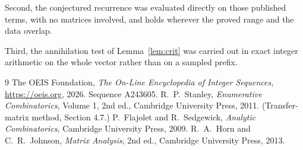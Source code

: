 \documentclass[11pt,a4paper]{article}
\theoremstyle{plain}
\theoremstyle{definition}
\begin{document}
Second, the conjectured recurrence was evaluated directly on those published terms, with no
matrices involved, and holds wherever the proved range and the data overlap.

Third, the annihilation test of Lemma~\ref{lem:crit} was carried out in exact integer
arithmetic on the whole vector rather than on a sampled prefix.

\begin{thebibliography}{9}
 The OEIS Foundation, \emph{The On-Line Encyclopedia of Integer
Sequences}, \url{https://oeis.org}, 2026. Sequence A243605.
 R.~P.~Stanley, \emph{Enumerative Combinatorics}, Volume 1, 2nd ed.,
Cambridge University Press, 2011. (Transfer-matrix method, Section 4.7.)
 P.~Flajolet and R.~Sedgewick, \emph{Analytic Combinatorics}, Cambridge
University Press, 2009.
 R.~A.~Horn and C.~R.~Johnson, \emph{Matrix Analysis}, 2nd ed., Cambridge
University Press, 2013.
\end{thebibliography}
\end{document}
